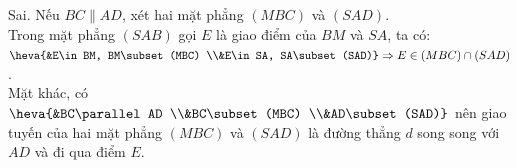 \begin{ex}
{\begin{itemchoice}
			\itemch Sai. Nếu $BC\parallel AD$, xét hai  mặt phẳng $(MBC)$ và $(SAD)$.\\
			Trong mặt phẳng $(SAB)$  gọi $E$ là giao điểm của $BM$ và $SA$, ta có: \\
			 $\heva{&E\in BM, BM\subset (MBC) \\&E\in SA, SA\subset (SAD)}\Rightarrow E\in (MBC)\cap (SAD)$.\\
			Mặt khác, có $\heva{&BC\parallel AD \\&BC\subset (MBC) \\&AD\subset (SAD)}$ nên giao tuyến của hai mặt phẳng $(MBC)$  và $(SAD)$ là đường thẳng $d$ song song với $AD$ và đi qua điểm $E$.
		\end{itemchoice}
	 }
\end{ex}

